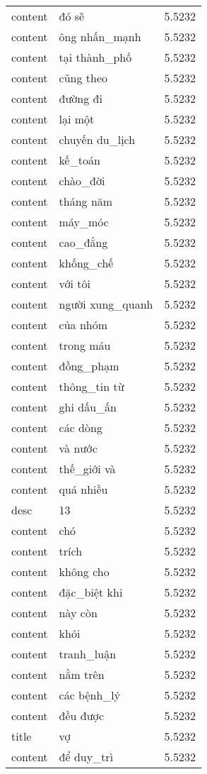 \documentclass{article}
\begin{document}
\begin{tabular}{lll}
content & đó sẽ & 5.5232\\
content & ông nhấn\_mạnh & 5.5232\\
content & tại thành\_phố & 5.5232\\
content & cũng theo & 5.5232\\
content & đường đi & 5.5232\\
content & lại một & 5.5232\\
content & chuyến du\_lịch & 5.5232\\
content & kế\_toán & 5.5232\\
content & chào\_đời & 5.5232\\
content & tháng năm & 5.5232\\
content & máy\_móc & 5.5232\\
content & cao\_đẳng & 5.5232\\
content & khống\_chế & 5.5232\\
content & với tôi & 5.5232\\
content & người xung\_quanh & 5.5232\\
content & của nhóm & 5.5232\\
content & trong máu & 5.5232\\
content & đồng\_phạm & 5.5232\\
content & thông\_tin từ & 5.5232\\
content & ghi dấu\_ấn & 5.5232\\
content & các dòng & 5.5232\\
content & và nước & 5.5232\\
content & thế\_giới và & 5.5232\\
content & quá nhiều & 5.5232\\
desc & 13 & 5.5232\\
content & chó & 5.5232\\
content & trích & 5.5232\\
content & không cho & 5.5232\\
content & đặc\_biệt khi & 5.5232\\
content & này còn & 5.5232\\
content & khói & 5.5232\\
content & tranh\_luận & 5.5232\\
content & nằm trên & 5.5232\\
content & các bệnh\_lý & 5.5232\\
content & đều được & 5.5232\\
title & vợ & 5.5232\\
content & để duy\_trì & 5.5232\\

\end{tabular}
\end{document}
